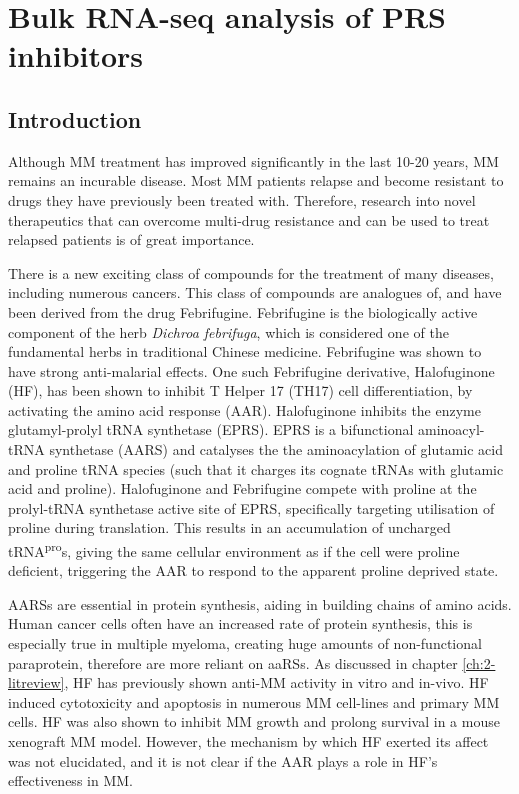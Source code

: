 \chapter{\label{ch:5-bulk}Bulk RNA-seq analysis of PRS inhibitors}


\section{Introduction}
Although MM treatment has improved significantly in the last 10-20 years, MM remains an incurable disease.
Most MM patients relapse and become resistant to drugs they have previously been treated with.
Therefore, research into novel therapeutics that can overcome multi-drug resistance and can be used to treat relapsed patients is of great importance.

There is a new exciting class of compounds for the treatment of many diseases, including numerous cancers.
This class of compounds are analogues of, and have been derived from the drug Febrifugine.
Febrifugine is the biologically active component of the herb \textit{Dichroa febrifuga}, which is considered one of the fundamental herbs in traditional Chinese medicine.
Febrifugine was shown to have strong anti-malarial effects.
One such Febrifugine derivative, Halofuginone (HF), has been shown to inhibit T Helper 17 (TH17) cell differentiation, by activating the amino acid response (AAR)\cite{sundrud2009halofuginone}.
Halofuginone inhibits the enzyme glutamyl-prolyl tRNA synthetase (EPRS).
EPRS is a bifunctional aminoacyl-tRNA synthetase (AARS) and catalyses the the aminoacylation of glutamic acid and proline tRNA species (such that it charges its cognate tRNAs with glutamic acid and proline).
Halofuginone and Febrifugine compete with proline at the prolyl-tRNA synthetase active site of EPRS, specifically targeting utilisation of proline during translation\cite{keller2012halofuginone}.
This results in an accumulation of uncharged tRNA\textsuperscript{pro}s, giving the same cellular environment as if the cell were proline deficient, triggering the AAR to respond to the apparent proline deprived state.

AARSs are essential in protein synthesis, aiding in building chains of amino acids.
Human cancer cells often have an increased rate of protein synthesis, this is especially true in multiple myeloma, creating huge amounts of non-functional paraprotein, therefore are more reliant on aaRSs.
As discussed in chapter \ref{ch:2-litreview}, HF has previously shown anti-MM activity in vitro and in-vivo.
HF induced cytotoxicity and apoptosis in numerous MM cell-lines and primary MM cells.
HF was also shown to inhibit MM growth and prolong survival in a mouse xenograft MM model.
However, the mechanism by which HF exerted its affect was not elucidated, and it is not clear if the AAR plays a role in HF's effectiveness in MM.

